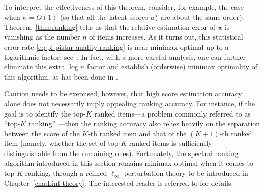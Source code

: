 To interpret the effectiveness of this theorem, consider, for example, the case when $\kappa=O(1)$ (so that all the latent scores
$w_{i}^{\star}$ are about the same order). Theorem~\ref{thm:ranking}
tells us that the relative estimation error of $\bm{\pi}$ is vanishing
as the number $n$ of items increases. As it turns out, this statistical error rate \eqref{eq:pi-pistar-quality-ranking}
 is near minimax-optimal up to a logarithmic
factor; see~\citet[Theorem 3]{negahban2016rank}. In fact, with a more careful
analysis, one can further eliminate this extra $\log n$ factor and establish (orderwise) minimax optimality of this algorithm,
as has been done in \citet[Theorem 5.2]{chen2017spectral}.

Caution needs to be exercised, however, that high score estimation accuracy alone does not necessarily imply appealing ranking accuracy.
For instance, if the goal is to identify the top-$K$ ranked items---a problem commonly referred to as ``top-$K$ ranking'' \citep{chen2015spectral}---then the ranking accuracy also relies heavily on the separation between the score of the $K$-th ranked item and that of the $(K+1)$-th ranked item (namely, whether the set of top-$K$ ranked items is sufficiently distinguishable from the remaining ones). Fortunately, the spectral ranking algorithm introduced in this section remains minimax optimal when it comes to top-$K$ ranking, through a refined $\ell_\infty$ perturbation theory to be introduced in Chapter~\ref{cha:Linf-theory}. The interested reader is referred to \citet{chen2017spectral} for details.


